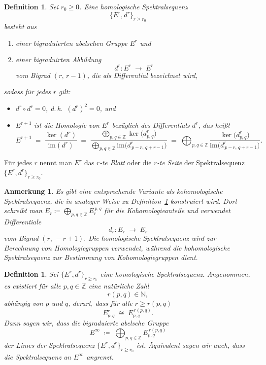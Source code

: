 \documentclass[12pt, hidelinks]{article}
\numberwithin{conj}{section}
\newtheorem{definition}[conj]{Definition}
\newtheorem{remark}[conj]{Anmerkung}
\newcommand{\Z}{\mathbb{Z}}
\begin{document}
\begin{definition}
    \label{homologischeSpektraleSequenz}
    Sei $r_0 \geq 0$. Eine \emph{homologische Spektralsequenz} 
    \[
        \{E^r,d^r\}_{r \geq r_0}
    \]
    besteht aus
    \begin{enumerate}[nolistsep]
        \item einer bigraduierten abelschen Gruppe $E^r$ und
        \item einer bigraduirten Abbildung
              \[
                d^r : E^r \;\longrightarrow\; E^r
              \]
              vom Bigrad $(r,\,r-1)$, die als \emph{Differential} bezeichnet wird,
    \end{enumerate}
    sodass für jedes $r$ gilt:
    \begin{itemize}[nolistsep]
        \item $d^r \circ d^r = 0$, d.\,h.\ $(d^r)^2 = 0$, und
        \item $E^{r+1}$ ist die Homologie von $E^r$ bezüglich des Differentials $d^r$, das heißt
              \[
                E^{r+1}
                \;=\;
                \frac{\ker(d^r)}{\mathrm{im}(d^r)}
                \;=\;
                \frac{\displaystyle\bigoplus_{p,q \in \Z} \ker\bigl(d^r_{p,q}\bigr)}%
                {\displaystyle\bigoplus_{p,q \in \Z} \mathrm{im}\!\bigl(d^r_{\,p-r,\,q+r-1}\bigr)}
                \;=\;
                \bigoplus_{p,q \in \Z}
                \frac{\ker\bigl(d^r_{p,q}\bigr)}{\mathrm{im}\!\bigl(d^r_{\,p-r,\,q+r-1}\bigr)}.
              \]
    \end{itemize}
\end{definition}

Für jedes $r$ nennt man $E^r$ das \emph{$r$-te Blatt} oder die \emph{$r$-te Seite} der Spektralsequenz $\{E^r,d^r\}_{r \geq r_0}$.

\begin{remark}
    Es gibt eine entsprechende Variante als \emph{kohomologische Spektralsequenz}, die in analoger Weise zu Definition~\ref{homologischeSpektraleSequenz} konstruiert wird. 
    Dort schreibt man $E_r \coloneqq \bigoplus_{p,q \in \Z} E_{r}^{\,p,q}$ für die Kohomologieanteile und verwendet Differentiale
    \[
        d_r : E_r \;\longrightarrow\; E_r
    \]
    vom Bigrad $(r,\,-r+1)$. Die homologische Spektralsequenz wird zur Berechnung von Homologiegruppen verwendet, während die kohomologische Spektralsequenz zur Bestimmung von Kohomologiegruppen dient.
\end{remark}

\begin{definition}
    Sei $\{E^r, d^r\}_{r \geq r_0}$ eine homologische Spektralsequenz. Angenommen, es existiert für alle $p,q \in \Z$ eine natürliche Zahl
    \[
        r(p,q) \in \mathbb{N},
    \]
    abhängig von $p$ und $q$, derart, dass für alle $r \ge r(p,q)$
    \[
        E^r_{p,q} \;\cong\; E_{p,q}^{\,r(p,q)}.
    \]
    Dann sagen wir, dass die bigraduierte abelsche Gruppe
    \[
        E^\infty \;\coloneqq\; \bigoplus_{p,q \in \Z} E_{p,q}^{\,r(p,q)}
    \]
    der \emph{Limes} der Spektralsequenz $\{E^r, d^r\}_{r \geq r_0}$ ist. Äquivalent sagen wir auch, dass die Spektralsequenz \emph{an} $E^\infty$ \emph{angrenzt}.
\end{definition}
\end{document}
